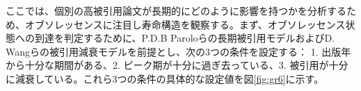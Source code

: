 ここでは、個別の高被引用論文が長期的にどのように影響を持つかを分析するため、オブソレッセンスに注目し寿命構造を観察する。まず、オブソレッセンス状態への到達を判定するために、P.D.B Paroloら\cite{Par1}の長期被引用モデルおよびD. Wangら\cite{Wan1}の被引用減衰モデルを前提とし、次の3つの条件を設定する： 1. 出版年から十分な期間がある、2. ピーク期が十分に過ぎ去っている、3. 被引用が十分に減衰している。これら3つの条件の具体的な設定値を図\ref{fig:gr6}に示す。
